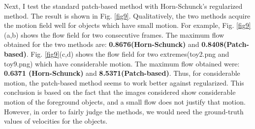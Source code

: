 \documentclass[11pt]{article}
\begin{document}
Next, I test the standard patch-based method with Horn-Schunck's regularized method. The result is shown in Fig. \ref{fig9}. Qualitatively, the two methods acquire the motion field well for objects which have small motion. For example, Fig. \ref{fig9}(a,b) shows the flow field for two consecutive frames. The maximum flow obtained for the two methods are: {\bf 0.8676(Horn-Schunck)} and {\bf 0.8408(Patch-based)}. Fig. \ref{fig9}(c,d) shows the flow field for two extremes(toy2.png and toy9.png) which have considerable motion. The maximum flow obtained were: {\bf 0.6371 (Horn-Schunck)} and {\bf 8.5371(Patch-based)}. Thus, for considerable motion, the patch-based method seems to work better against regularized. This conclusion is based on the fact that the images considered show considerable motion of the foreground objects, and a small flow does not justify that motion. However, in order to fairly judge the methods, we would need the ground-truth values of velocities for the objects.
\vspace{-10pt}
\end{document}
